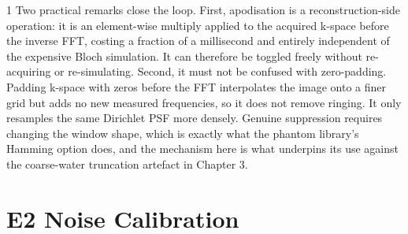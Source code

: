 \begin{spacing}{1}
Two practical remarks close the loop. First, apodisation is a
reconstruction-side operation: it is an element-wise multiply applied to
the acquired k-space before the inverse FFT, costing a fraction of a
millisecond and entirely independent of the expensive Bloch simulation.
It can therefore be toggled freely without re-acquiring or re-simulating.
Second, it must not be confused with zero-padding. Padding k-space with
zeros before the FFT interpolates the image onto a finer grid but adds no
new measured frequencies, so it does not remove ringing. It only
resamples the same Dirichlet PSF more densely. Genuine suppression
requires changing the window shape, which is exactly what the phantom
library's Hamming option does, and the mechanism here is what underpins
its use against the coarse-water truncation artefact in Chapter 3.
\end{spacing}

\section{E2 Noise Calibration}
\label{app:noise-calibration}

